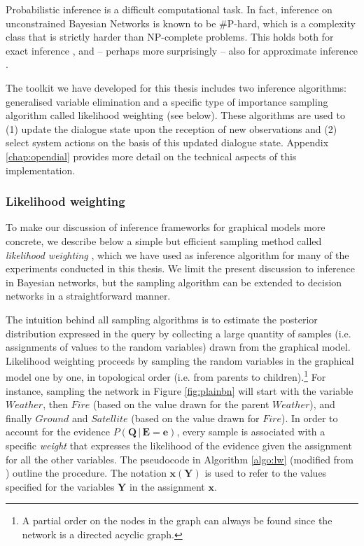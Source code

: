 Probabilistic inference is a difficult computational task.  In fact, inference on unconstrained Bayesian Networks is known to be {\#}P-hard, which is a complexity class that is strictly harder than NP-complete problems.  This holds both for exact inference \citep{Cooper90}, and -- perhaps more surprisingly -- also for approximate inference \citep{Dagum1993}.  


The \opendial toolkit we have developed for this thesis includes two inference algorithms: generalised variable elimination and a specific type of importance sampling algorithm called likelihood weighting (see below). These algorithms are used to (1) update the dialogue state upon the reception of new observations and (2) select system actions on the basis of this updated dialogue state.  Appendix \ref{chap:opendial} provides more detail on the technical aspects of this implementation.  

\subsubsection*{Likelihood weighting} 

To make our discussion of inference frameworks for graphical models more concrete, we describe below a simple but efficient sampling method called \textit{likelihood weighting} \citep{FungC89}, which we have used as inference algorithm for many of the experiments conducted in this thesis.  We limit the present discussion to inference in Bayesian networks, but the sampling algorithm can be extended to decision networks in a straightforward manner.

The intuition behind all sampling algorithms is to estimate the posterior distribution expressed in the query by collecting a large quantity of samples (i.e. assignments of values to the random variables) drawn from the graphical model.  Likelihood weighting proceeds by sampling the random variables in the graphical model one by one, in topological order (i.e. from parents to children).\footnote{A partial order on the nodes in the graph can always be found since the network is a directed acyclic graph.} For instance, sampling the network in Figure \ref{fig:plainbn} will start with the variable $\mathit{Weather}$, then $\mathit{Fire}$ (based on the value drawn for the parent $\mathit{Weather}$), and finally $\mathit{Ground}$ and $\mathit{Satellite}$ (based on the value drawn for $\mathit{Fire}$).  In order to account for the evidence $P(\mathbf{Q} \, | \, \mathbf{E} =\mathbf{e})$, every sample is associated with a specific \textit{weight} that expresses the likelihood of the evidence given the assignment for all the other variables.  The pseudocode in Algorithm \ref{algo:lw} (modified from \cite{aima2010,Koller+Friedman:09}) outline the procedure.  The notation $\mathbf{x}(\mathbf{Y})$ is used to refer to the values specified for the variables $\mathbf{Y}$ in the assignment $\mathbf{x}$.

